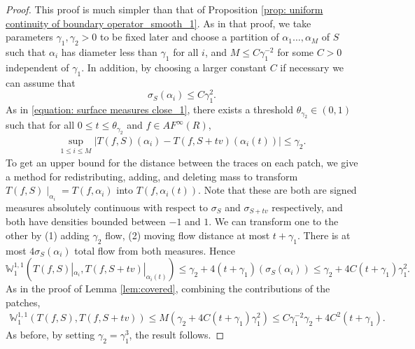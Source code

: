 \documentclass[11pt]{article}
\theoremstyle{remark}
\theoremstyle{definition}
\newcommand{\m}[1]{\mathbb{#1}}
\begin{document}
\begin{proof} This proof is much simpler than that of Proposition \ref{prop: uniform continuity of boundary operator_smooth_1}. As in that proof, we take parameters $\gamma_1, \gamma_2>0$ to be fixed later and choose a partition of $\alpha_1\ldots, \alpha_M$ of $S$ such that $\alpha_i$ has diameter less than $\gamma_1$ for all $i$, and $M\leq C\gamma_1^{-2}$ for some $C>0$ independent of $\gamma_1$. In addition, by choosing a larger constant $C$ if necessary we can assume that 
$$\sigma_{S}(\alpha_i)\leq C\gamma_1^2.$$
As in \eqref{equation: surface measures close_1}, there exists a threshold $\theta_{\gamma_2}\in (0,1)$ such that for all $0\leq t\leq \theta_{\gamma_2}$ and $f\in AF^\infty(R)$,
\begin{align}\label{equation: surface measures close_3}
	\sup_{1\leq i\leq M}\bigg| T(f, S)(\alpha_i)- T(f, S+tv)(\alpha_i(t)) \bigg| \leq \gamma_2.
\end{align}
To get an upper bound for the distance between the traces on each patch, we give a method for redistributing, adding, and deleting mass to transform $T(f, S)\mid_{\alpha_i}=T(f,\alpha_i)$ into $T(f,\alpha_i(t))$. Note that these are both are signed measures absolutely continuous with respect to $\sigma_S$ and $\sigma_{S+tv}$ respectively, and both have densities bounded between $-1$ and $1$. We can transform one to the other by (1) adding $\gamma_2$ flow, (2) moving flow distance at most $t+\gamma_1$. There is at most $4 \sigma_S(\alpha_i)$ total flow from both measures. Hence
$$\m W^{1,1}_1(T(f, S)|_{\alpha_i}, T(f, S+tv)|_{\alpha_i(t)})\leq \gamma_2+ 4(t+\gamma_1)(\sigma_{S}(\alpha_i))\leq \gamma_2+ 4C(t+\gamma_1)\gamma_1^2.$$
As in the proof of Lemma \ref{lem:covered}, combining the contributions of the patches,
\begin{eqnarray*}
 \m W^{1,1}_1(T(f, S), T(f, S+tv))\leq M\left(\gamma_2+ 4C(t+\gamma_1)\gamma_1^2\right)\leq C\gamma_1^{-2}\gamma_2+ 4C^2(t+\gamma_1).
\end{eqnarray*}
As before, by setting $\gamma_2=\gamma_1^3$, the result follows.
\end{proof}
\end{document}
